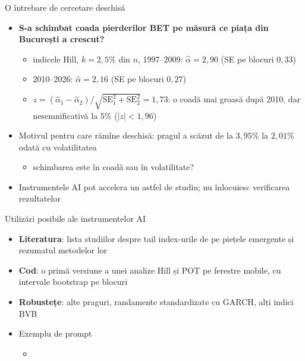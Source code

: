 \begin{frame}{O întrebare de cercetare deschisă}
\itemsize{\small}
\begin{itemize}
    \item \textbf{S-a schimbat coada pierderilor BET pe măsură ce piața din București a crescut?}
    \begin{itemize}
        \item indicele Hill, $k = 2{,}5\%$ din $n$, 1997--2009: $\hat\alpha = 2{,}90$ (SE pe blocuri $0{,}33$)
        \item 2010--2026: $\hat\alpha = 2{,}16$ (SE pe blocuri $0{,}27$)
        \item $z = (\hat\alpha_1 - \hat\alpha_2)/\sqrt{\mathrm{SE}_1^2 + \mathrm{SE}_2^2} = 1{,}73$: o coadă mai groasă după 2010, dar nesemnificativă la 5\% ($|z| < 1{,}96$)
    \end{itemize}
    \item Motivul pentru care rămîne deschisă: pragul a scăzut de la $3{,}95\%$ la $2{,}01\%$ odată cu volatilitatea
    \begin{itemize}
        \item schimbarea este în coadă sau în volatilitate?
    \end{itemize}
    \item Instrumentele AI pot accelera un astfel de studiu; nu înlocuiesc verificarea rezultatelor 
\end{itemize}
\end{frame}

\begin{frame}{Utilizări posibile ale instrumentelor AI}
\itemsize{\small}
\begin{itemize}
    \item \textbf{Literatura}: lista studiilor despre tail index-urile de pe piețele emergente și rezumatul metodelor lor
    \item \textbf{Cod}: o primă versiune a unei analize Hill și POT pe ferestre mobile, cu intervale bootstrap pe blocuri
    \item \textbf{Robustețe}: alte praguri, randamente standardizate cu GARCH, alți indici BVB
    \item Exemplu de prompt
    \begin{itemize}
        \item {}
    \end{itemize}
\end{itemize}
\end{frame}

